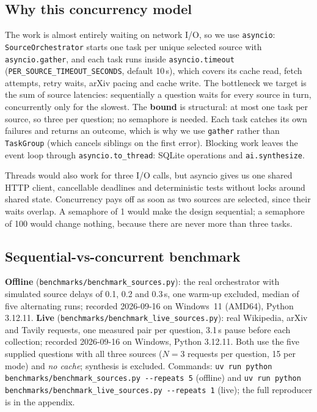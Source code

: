 \documentclass[11pt,a4paper]{article}
\newcommand{\cmd}[1]{\texttt{#1}}
\begin{document}
\subsection{Why this concurrency model}

The work is almost entirely waiting on network I/O, so we use \texttt{asyncio}:
\texttt{SourceOrchestrator} starts one task per unique selected source with
\cmd{asyncio.gather}, and each task runs inside \cmd{asyncio.timeout}
(\cmd{PER\_SOURCE\_TIMEOUT\_SECONDS}, default 10\,s), which covers its cache read,
fetch attempts, retry waits, arXiv pacing and cache write. The bottleneck we
target is the sum of source latencies: sequentially a question waits for every
source in turn, concurrently only for the slowest. The \textbf{bound} is
structural: at most one task per source, so three per question; no semaphore is
needed. Each task catches its own failures and returns an outcome, which is why
we use \cmd{gather} rather than \texttt{TaskGroup} (which cancels siblings on the
first error). Blocking work leaves the event loop through
\cmd{asyncio.to\_thread}: SQLite operations and \cmd{ai.synthesize}.

Threads would also work for three I/O calls, but asyncio gives us one shared
HTTP client, cancellable deadlines and deterministic tests without locks around
shared state. Concurrency pays off as soon as two sources are selected, since
their waits overlap. A semaphore of 1 would make the design sequential; a
semaphore of 100 would change nothing, because there are never more than three
tasks.

\subsection{Sequential-vs-concurrent benchmark}

\textbf{Offline} (\cmd{benchmarks/benchmark\_sources.py}): the real orchestrator
with simulated source delays of 0.1, 0.2 and 0.3\,s, one warm-up excluded, median
of five alternating runs; recorded 2026-09-16 on Windows~11 (AMD64), Python
3.12.11. \textbf{Live} (\cmd{benchmarks/benchmark\_live\_sources.py}): real
Wikipedia, arXiv and Tavily requests, one measured pair per question, 3.1\,s pause
before each collection; recorded 2026-09-16 on Windows, Python 3.12.11. Both use
the five supplied questions with all three sources ($N = 3$ requests per
question, 15 per mode) and \emph{no cache}; synthesis is excluded. Commands:
\cmd{uv run python benchmarks/benchmark\_sources.py -{}-repeats 5} (offline) and
\cmd{uv run python benchmarks/benchmark\_live\_sources.py -{}-repeats 1} (live);
the full reproducer is in the appendix.
\end{document}
